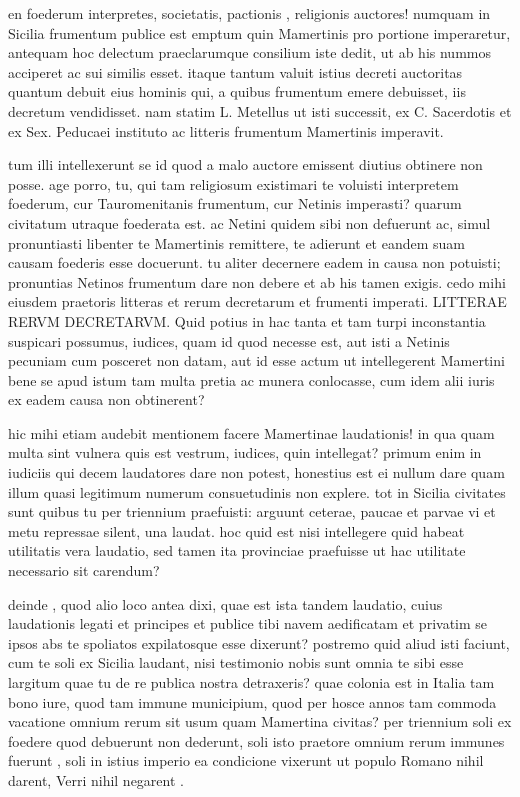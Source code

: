  en foederum interpretes, societatis, pactionis , religionis auctores! numquam in Sicilia frumentum publice est emptum quin Mamertinis pro portione imperaretur, antequam hoc delectum praeclarumque consilium iste dedit, ut ab his nummos acciperet ac sui similis esset. itaque tantum valuit istius decreti auctoritas quantum debuit eius hominis qui, a quibus frumentum emere debuisset, iis decretum vendidisset. nam statim L. Metellus ut isti successit, ex C. Sacerdotis et ex Sex. Peducaei instituto ac litteris frumentum Mamertinis imperavit.

 tum illi intellexerunt se id quod a malo auctore emissent diutius obtinere non posse. age porro, tu, qui tam religiosum existimari te voluisti interpretem foederum, cur Tauromenitanis frumentum, cur Netinis imperasti? quarum civitatum utraque foederata est. ac Netini quidem sibi non defuerunt ac, simul pronuntiasti libenter te Mamertinis remittere, te adierunt et eandem suam causam foederis esse docuerunt. tu aliter decernere eadem in causa non potuisti; pronuntias Netinos frumentum dare non debere et ab his tamen exigis. cedo mihi eiusdem praetoris litteras et rerum decretarum et frumenti imperati. LITTERAE RERVM DECRETARVM. Quid potius in hac tanta et tam turpi inconstantia suspicari possumus, iudices, quam id quod necesse est, aut isti a Netinis pecuniam cum posceret non datam, aut id esse actum ut intellegerent Mamertini bene se apud istum tam multa pretia ac munera conlocasse, cum idem alii iuris ex eadem causa non obtinerent?

 hic mihi etiam audebit mentionem facere Mamertinae laudationis! in qua quam multa sint vulnera quis est vestrum, iudices, quin intellegat? primum enim in iudiciis qui decem laudatores dare non potest, honestius est ei nullum dare quam illum quasi legitimum numerum consuetudinis non explere. tot in Sicilia civitates sunt quibus tu per triennium praefuisti: arguunt ceterae, paucae et parvae vi et metu repressae silent, una laudat. hoc quid est nisi intellegere quid habeat utilitatis vera laudatio, sed tamen ita provinciae praefuisse ut hac utilitate necessario sit carendum?

 deinde , quod alio loco antea dixi, quae est ista tandem laudatio, cuius laudationis legati et principes et publice tibi navem aedificatam et privatim se ipsos abs te spoliatos expilatosque esse dixerunt? postremo quid aliud isti faciunt, cum te soli ex Sicilia laudant, nisi testimonio nobis sunt omnia te sibi esse largitum quae tu de re publica nostra detraxeris? quae colonia est in Italia tam bono iure, quod tam immune municipium, quod per hosce annos tam commoda vacatione omnium rerum sit usum quam Mamertina civitas? per triennium soli ex foedere quod debuerunt non dederunt, soli isto praetore omnium rerum immunes fuerunt , soli in istius imperio ea condicione vixerunt ut populo Romano nihil darent, Verri nihil negarent .

